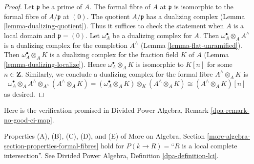 \begin{proof}
Let $\mathfrak p$ be a prime of $A$. The formal fibre of $A$ at $\mathfrak p$
is isomorphic to the formal fibre of $A/\mathfrak p$ at $(0)$. The quotient
$A/\mathfrak p$ has a dualizing complex
(Lemma \ref{lemma-dualizing-quotient}).
Thus it suffices to check the statement
when $A$ is a local domain and $\mathfrak p = (0)$.
Let $\omega_A^\bullet$ be a dualizing complex for $A$. Then
$\omega_A^\bullet \otimes_A A^\wedge$ is a dualizing complex
for the completion $A^\wedge$
(Lemma \ref{lemma-flat-unramified}).
Then $\omega_A^\bullet \otimes_A K$ is a dualizing
complex for the fraction field $K$ of $A$
(Lemma \ref{lemma-dualizing-localize}).
Hence $\omega_A^\bullet \otimes_A K$
is isomorphic to $K[n]$ for some $n \in \mathbf{Z}$.
Similarly, we conclude a dualizing complex for the formal fibre
$A^\wedge \otimes_A K$ is
$$
\omega_A^\bullet \otimes_A A^\wedge \otimes_{A^\wedge} (A^\wedge \otimes_A K) =
(\omega_A^\bullet \otimes_A K) \otimes_K (A^\wedge \otimes_A K) \cong
(A^\wedge \otimes_A K)[n]
$$
as desired.
\end{proof}

\noindent
Here is the verification promised in
Divided Power Algebra, Remark \ref{dpa-remark-no-good-ci-map}.

\begin{lemma}
\label{lemma-formal-fibres-lci}
Properties (A), (B), (C), (D), and (E) of
More on Algebra, Section \ref{more-algebra-section-properties-formal-fibres}
hold for $P(k \to R) =$``$R$ is a local complete intersection''.
See Divided Power Algebra, Definition \ref{dpa-definition-lci}.
\end{lemma}

